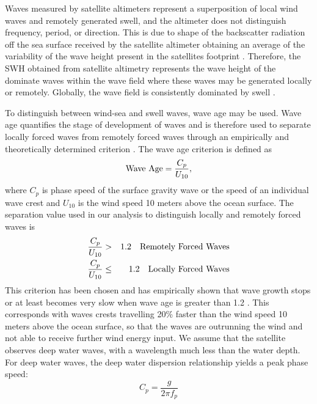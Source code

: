 \documentclass[draft,linenumbers]{agujournal2018}
\begin{document}
Waves measured by satellite altimeters represent a superposition of local wind waves and remotely generated swell, and the altimeter does not distinguish frequency, period, or direction. This is due to shape of the backscatter radiation off the sea surface received by the satellite altimeter obtaining an average of the variability of the wave height present in the satellites footprint \cite{chelton2001satellite}. Therefore, the SWH obtained from satellite altimetry represents the wave height of the dominate waves within the wave field where these waves may be generated locally or remotely. Globally, the wave field is consistently dominated by swell \cite{chen2002global,semedo2011global}.


To distinguish between wind-sea and swell waves, wave age may be used. Wave age quantifies the stage of development of waves and is therefore used to separate locally forced waves from remotely forced waves through an empirically and theoretically determined criterion \cite{alves2003revisiting}. The wave age criterion is defined as 
\begin{equation}
     \mbox{\rm Wave Age} = \frac{C_{p}}{U_{10}},
 \end{equation}
where $C_{p}$ is phase speed of the surface gravity wave or the speed of an individual wave crest and $U_{10}$ is the wind speed 10 meters above the ocean surface. The separation value used in our analysis to distinguish locally and remotely forced waves is 
\begin{eqnarray}
     \frac{C_{p}}{U_{10}} & > & 1.2\quad {\mbox{\rm Remotely Forced Waves}} \\
     \frac{C_{p}}{U_{10}} & \leq & 1.2\quad {\mbox{\rm Locally Forced Waves}}
\end{eqnarray}
This criterion has been chosen and has empirically shown that wave growth stops or at least becomes very slow when wave age is greater than 1.2 \cite{donelan1992growth}. This corresponds with waves crests travelling 20\% faster than the wind speed 10 meters above the ocean surface, so that the waves are outrunning the wind and not able to receive further wind energy input. We assume that the satellite observes deep water waves, with a wavelength much less than the water depth. For deep water waves, the deep water dispersion relationship yields a peak phase speed: 
\begin{equation}
    C_{p} = \frac{g}{2\pi f_{p}}
\end{equation}
\end{document}
